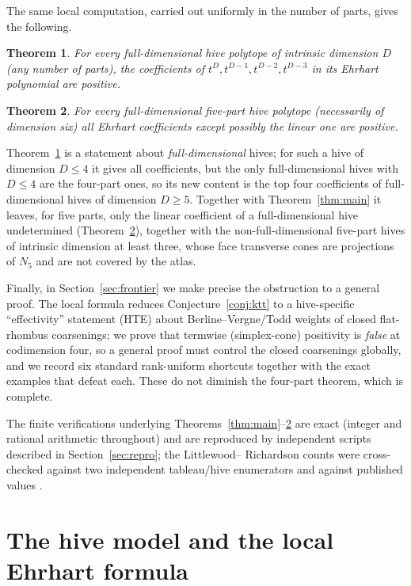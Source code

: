 \documentclass[11pt]{amsart}
\newtheorem{theorem}{Theorem}
\theoremstyle{definition}
\begin{document}
The same local computation, carried out uniformly in the number of parts, gives
the following.

\begin{theorem}\label{thm:topfour}
For every full-dimensional hive polytope of intrinsic dimension $D$ (any number
of parts), the coefficients of $t^{D},t^{D-1},t^{D-2},t^{D-3}$ in its Ehrhart
polynomial are positive.
\end{theorem}

\begin{theorem}\label{thm:sidefive}
For every full-dimensional five-part hive polytope (necessarily of dimension
six) all Ehrhart coefficients except possibly the linear one are positive.
\end{theorem}

Theorem~\ref{thm:topfour} is a statement about \emph{full-dimensional} hives;
for such a hive of dimension $D\le 4$ it gives all coefficients, but the only
full-dimensional hives with $D\le 4$ are the four-part ones, so its new content
is the top four coefficients of full-dimensional hives of dimension $D\ge 5$.
Together with Theorem~\ref{thm:main} it leaves, for five parts, only the linear
coefficient of a full-dimensional hive undetermined (Theorem~\ref{thm:sidefive}),
together with the non-full-dimensional five-part hives of intrinsic dimension at
least three, whose face transverse cones are projections of $N_5$ and are not
covered by the atlas.

Finally, in Section~\ref{sec:frontier} we make precise the obstruction to a
general proof. The local formula reduces Conjecture~\ref{conj:ktt} to a
hive-specific ``effectivity'' statement (HTE) about Berline--Vergne/Todd weights
of closed flat-rhombus coarsenings; we prove that termwise (simplex-cone)
positivity is \emph{false} at codimension four, so a general proof must control
the closed coarsenings globally, and we record six standard rank-uniform
shortcuts together with the exact examples that defeat each. These do not
diminish the four-part theorem, which is complete.

\medskip

The finite verifications underlying Theorems~\ref{thm:main}--\ref{thm:sidefive}
are exact (integer and rational arithmetic throughout) and are reproduced by
independent scripts described in Section~\ref{sec:repro}; the Littlewood--%
Richardson counts were cross-checked against two independent tableau/hive
enumerators and against published values \cite{lrcalc}.

\section{The hive model and the local Ehrhart formula}\label{sec:prelim}
\end{document}
